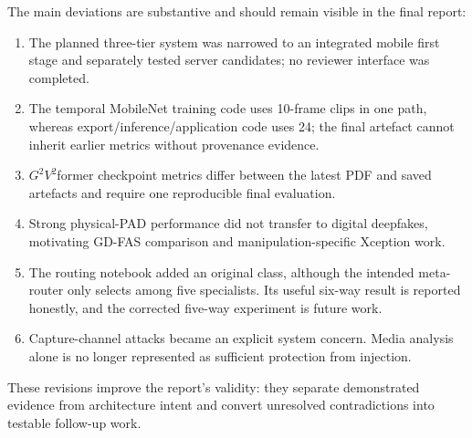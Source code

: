 The main deviations are substantive and should remain visible in the final report:

\begin{enumerate}
  \item The planned three-tier system was narrowed to an integrated mobile first
        stage and separately tested server candidates; no reviewer interface was
        completed.
  \item The temporal MobileNet training code uses 10-frame clips in one path,
        whereas export/inference/application code uses 24; the final artefact
        cannot inherit earlier metrics without provenance evidence.
  \item $G^2V^2$former checkpoint metrics differ between the latest PDF and saved
        artefacts and require one reproducible final evaluation.
  \item Strong physical-PAD performance did not transfer to digital deepfakes,
        motivating GD-FAS comparison and manipulation-specific Xception work.
  \item The routing notebook added an original class, although the intended
        meta-router only selects among five specialists. Its useful six-way result
        is reported honestly, and the corrected five-way experiment is future work.
  \item Capture-channel attacks became an explicit system concern. Media analysis
        alone is no longer represented as sufficient protection from injection.
\end{enumerate}

These revisions improve the report's validity: they separate demonstrated
evidence from architecture intent and convert unresolved contradictions into
testable follow-up work.
